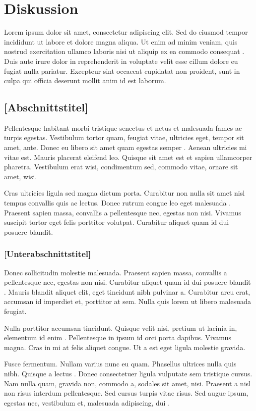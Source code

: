 \chapter{Diskussion}

Lorem ipsum dolor sit amet, consectetur adipiscing elit. Sed do eiusmod tempor incididunt ut labore et dolore magna aliqua. Ut enim ad minim veniam, quis nostrud exercitation ullamco laboris nisi ut aliquip ex ea commodo consequat \cite{DummyBook2024}. Duis aute irure dolor in reprehenderit in voluptate velit esse cillum dolore eu fugiat nulla pariatur. Excepteur sint occaecat cupidatat non proident, sunt in culpa qui officia deserunt mollit anim id est laborum.

\section{[Abschnittstitel]}

Pellentesque habitant morbi tristique senectus et netus et malesuada fames ac turpis egestas. Vestibulum tortor quam, feugiat vitae, ultricies eget, tempor sit amet, ante. Donec eu libero sit amet quam egestas semper \cite{DummyArticle2024}. Aenean ultricies mi vitae est. Mauris placerat eleifend leo. Quisque sit amet est et sapien ullamcorper pharetra. Vestibulum erat wisi, condimentum sed, commodo vitae, ornare sit amet, wisi.

Cras ultricies ligula sed magna dictum porta. Curabitur non nulla sit amet nisl tempus convallis quis ac lectus. Donec rutrum congue leo eget malesuada \cite{DummyIncollection2024}. Praesent sapien massa, convallis a pellentesque nec, egestas non nisi. Vivamus suscipit tortor eget felis porttitor volutpat. Curabitur aliquet quam id dui posuere blandit.

\subsection{[Unterabschnittstitel]}

Donec sollicitudin molestie malesuada. Praesent sapien massa, convallis a pellentesque nec, egestas non nisi. Curabitur aliquet quam id dui posuere blandit \cite{DummyBook2024}. Mauris blandit aliquet elit, eget tincidunt nibh pulvinar a. Curabitur arcu erat, accumsan id imperdiet et, porttitor at sem. Nulla quis lorem ut libero malesuada feugiat.

Nulla porttitor accumsan tincidunt. Quisque velit nisi, pretium ut lacinia in, elementum id enim \cite{DummyMisc2024}. Pellentesque in ipsum id orci porta dapibus. Vivamus magna. Cras in mi at felis aliquet congue. Ut a est eget ligula molestie gravida.

Fusce fermentum. Nullam varius nunc eu quam. Phasellus ultrices nulla quis nibh. Quisque a lectus \cite{DummyArticle2024}. Donec consectetuer ligula vulputate sem tristique cursus. Nam nulla quam, gravida non, commodo a, sodales sit amet, nisi. Praesent a nisl non risus interdum pellentesque. Sed cursus turpis vitae risus. Sed augue ipsum, egestas nec, vestibulum et, malesuada adipiscing, dui \cite{DummyBook2024}.
